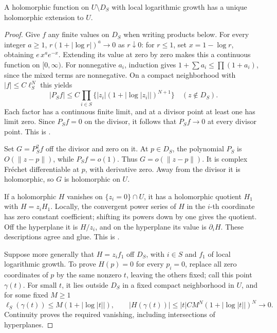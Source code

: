\begin{srlemma}
\label{lem:faithful-removable-log-growth}
A holomorphic function on \(U\setminus D_S\) with local logarithmic
growth has a unique holomorphic extension to \(U\).
\end{srlemma}
\begin{proof}
Give \(f\) any finite values on \(D_S\) when writing products below.
For every integer \(a\ge1\),
\(r(1+|\log r|)^a\to0\) as \(r\downarrow0\):
for \(r\le1\), set \(x=1-\log r\), obtaining \(e\,x^ae^{-x}\).
Extending its value at zero by zero makes this a continuous
function on \([0,\infty)\).
For nonnegative \(a_i\), induction gives
\(1+\sum a_i\le\prod(1+a_i)\), since the mixed terms are nonnegative.
On a compact neighborhood with \(|f|\le C\ell_S^N\) this yields
\[
 |P_Sf|\le C\prod_{i\in S}
       \{|z_i|(1+|\log|z_i||)^{N+1}\}\quad(z\notin D_S).
 \tag{BG2}\label{eq:faithful-product-log-majorant}
\]
Each factor has a continuous finite limit, and at a divisor
point at least one has limit zero.
Since \(P_Sf=0\) on the divisor, it follows that \(P_Sf\to0\)
at every divisor point.
This is .

Set \(G=P_S^2f\) off the divisor and zero on it.
At \(p\in D_S\), the polynomial \(P_S\) is
\(O(\|z-p\|)\), while \(P_Sf=o(1)\).
Thus \(G=o(\|z-p\|)\).
It is complex Fr\'echet differentiable at \(p\), with derivative zero.
Away from the divisor it is holomorphic, so \(G\) is holomorphic on \(U\).

If a holomorphic \(H\) vanishes on \(\{z_i=0\}\cap U\), it has a
holomorphic quotient \(H_1\) with \(H=z_iH_1\).
Locally, the convergent power series of \(H\) in the \(i\)-th
coordinate has zero constant coefficient; shifting its powers
down by one gives the quotient.
Off the hyperplane it is \(H/z_i\), and on the hyperplane its
value is \(\partial_iH\).
These descriptions agree and glue.
This is .

Suppose more generally that \(H=z_if_1\) off \(D_S\), with
\(i\in S\) and \(f_1\) of local logarithmic growth.
To prove \(H(p)=0\) for every \(p_i=0\), replace all zero
coordinates of \(p\) by the same nonzero \(t\), leaving the
others fixed; call this point \(\gamma(t)\).
For small \(t\), it lies outside \(D_S\) in a fixed compact
neighborhood in \(U\), and for some fixed \(M\ge1\)
\[
 \ell_S(\gamma(t))\le M(1+|\log|t||),\qquad
 |H(\gamma(t))|\le |t|CM^N(1+|\log|t||)^N\longrightarrow0.
\]
Continuity proves the required vanishing, including intersections
of hyperplanes.


\end{proof}
